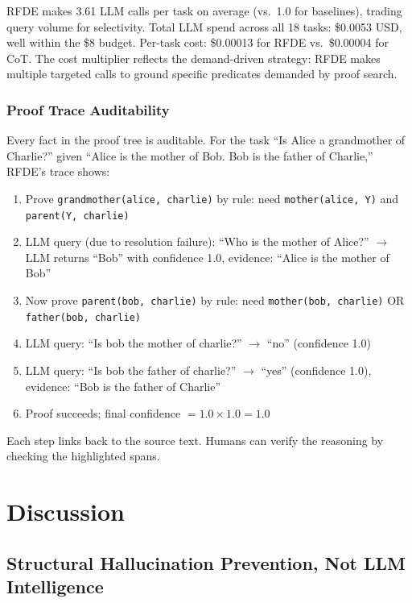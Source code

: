 \documentclass[11pt,letterpaper]{article}
\begin{document}
RFDE makes 3.61 LLM calls per task on average (vs.\ 1.0 for baselines), trading query volume for selectivity. Total LLM
spend across all 18 tasks: \$0.0053 USD, well within the \$8 budget. Per-task cost: \$0.00013 for RFDE vs.\ \$0.00004 for
CoT. The cost multiplier reflects the demand-driven strategy: RFDE makes multiple targeted calls to ground specific predicates
demanded by proof search.

\subsubsection{Proof Trace Auditability}

Every fact in the proof tree is auditable. For the task ``Is Alice a grandmother of Charlie?'' given ``Alice is the mother
of Bob. Bob is the father of Charlie,'' RFDE's trace shows:

\begin{enumerate}
  \item Prove \texttt{grandmother(alice, charlie)} by rule: need \texttt{mother(alice, Y)} and \texttt{parent(Y, charlie)}
  \item LLM query (due to resolution failure): ``Who is the mother of Alice?'' $\to$ LLM returns ``Bob'' with confidence 1.0,
    evidence: ``Alice is the mother of Bob''
  \item Now prove \texttt{parent(bob, charlie)} by rule: need \texttt{mother(bob, charlie)} OR \texttt{father(bob, charlie)}
  \item LLM query: ``Is bob the mother of charlie?'' $\to$ ``no'' (confidence 1.0)
  \item LLM query: ``Is bob the father of charlie?'' $\to$ ``yes'' (confidence 1.0), evidence: ``Bob is the father of Charlie''
  \item Proof succeeds; final confidence $= 1.0 \times 1.0 = 1.0$
\end{enumerate}

Each step links back to the source text. Humans can verify the reasoning by checking the highlighted spans.

\section{Discussion}

\subsection{Structural Hallucination Prevention, Not LLM Intelligence}
\end{document}
